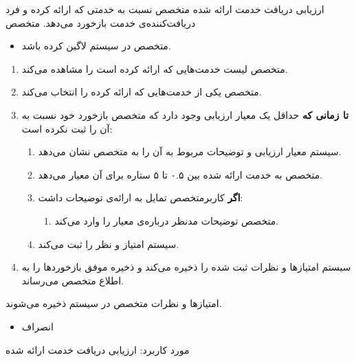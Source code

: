 \usecase
{
	ارزیابی دریافت خدمت ارائه شده
}
{}
{
	متخصص نسبت به خدمتی که ارائه کرده و فرد دریافت‌کننده‌ی خدمت بازخورد می‌دهد.
}
{
	متخصص
}
{}
{
	\begin{itemize}
		\vspace*{-0.6cm}
		\item 
		متخصص در سیستم لاگین کرده باشد.
	\end{itemize}
}
{
	\vspace*{-0.6cm}
	\begin{enumerate}
		\item 
		متخصص لیست خدمت‌هایی که ارائه کرده است را مشاهده می‌کند.
		\item
		متخصص یکی از خدمت‌هایی که ارائه کرده را انتخاب می‌کند.
		\item
		\textbf{تا زمانی که} حداقل یک معیار ارزیابی وجود دارد که متخصص بازخورد خود نسبت به آن را ثبت نکرده است:
		
		\begin{enumerate}[label=\theenumi.\arabic*.]
			\item
			سیستم معیار ارزیابی و توضیحات مربوط به آن را به متخصص نشان می‌دهد.
			\item 
			متخصص به خدمت ارائه شده بین ۰.۵ تا ۵ ستاره برای آن معیار می‌دهد.
			\item 
			\textbf{اگر} کاربرمتخصص تمایل به ارائه‌ی توضیحات داشت:
			\begin{enumerate}
				\item 
				متخصص توضیحات مدنظر درباره‌ی معیار را وارد می‌کند. 
			\end{enumerate}
			\item 
			سیستم امتیاز و نظر را ثبت می‌کند.
		\end{enumerate}
		\item
		سیستم امتیازها و نظرات ثبت شده را ذخیره می‌کند و ذخیره موفق بازخوردها را به اطلاع متخصص می‌رساند.
		
	\end{enumerate}
}
{
	امتیازها و نظرات متخصص در سیستم ذخیره می‌شوند.
}
{
	\begin{itemize}
		\vspace*{-0.6cm}
		\item 
		انصراف
	\end{itemize}
}
{
	مورد کاربرد: ارزیابی دریافت خدمت ارائه شده
}




